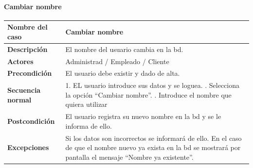 \paragraph{Cambiar nombre}
\begin{table}[H]
	\centering
	\small
	\begin{tabularx}{0.8\textwidth}{|p{3.5cm}|X|}
		\hline
		\rowcolor{lightgray}
		\textbf{Nombre del caso}  & \textbf{Cambiar nombre}                                                                                                                                                    \\
		\hline
		\textbf{Descripción}      & El nombre del usuario cambia en la \gls{bd}.                                                                                                                               \\
		\hline
		\textbf{Actores}          & Administrad / Empleado / Cliente                                                                                                                                           \\
		\hline
		\textbf{Precondición}     & El usuario debe existir y dado de alta.                                                                                                                                    \\
		\hline
		\textbf{Secuencia normal} & 1. EL usuario introduce sus datos y se loguea. \newline
		2. Selecciona la opción ``Cambiar nombre''. \newline
		3. Introduce el nombre que quiera utilizar                                                                                                                                                             \\
		\hline
		\textbf{Postcondición}    & El usuario registra su nuevo nombre en la \gls{bd} y se le informa de ello.                                                                                                \\
		\hline
		\textbf{Excepciones}      & Si los datos son incorrectos se informará de ello. En el caso de que el nombre nuevo ya exista en la \gls{bd} se mostrará por pantalla el mensaje ``Nombre ya existente''. \\
		\hline
	\end{tabularx}
\end{table}
